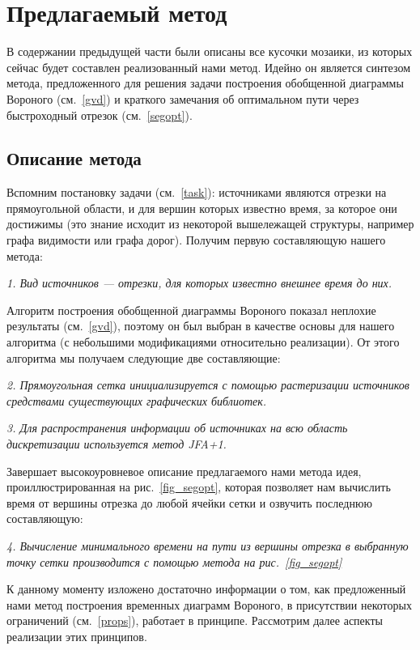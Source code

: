 \documentclass[12pt]{article}
\begin{document}
\section{Предлагаемый метод}
В содержании предыдущей части были описаны все кусочки мозаики, из которых 
сейчас будет составлен реализованный нами метод. Идейно он является синтезом
метода, предложенного для решения задачи построения обобщенной диаграммы Вороного 
(см.~\ref{gvd}) и краткого замечания об оптимальном пути через быстроходный 
отрезок (см.~\ref{segopt}).

\subsection{Описание метода}
Вспомним постановку задачи (см.~\ref{task}): источниками являются отрезки на прямоугольной
области, и для вершин которых известно время, за которое они достижимы (это знание исходит из
некоторой вышележащей структуры, например графа видимости или графа дорог). Получим 
первую  составляющую нашего метода:

\emph{1. Вид источников --- отрезки, для которых известно внешнее время до них.}

Алгоритм построения обобщенной диаграммы Вороного показал неплохие
результаты (см.~\ref{gvd}), поэтому он был выбран в качестве основы 
для нашего алгоритма (с небольшими модификациями относительно реализации).
От этого алгоритма мы получаем следующие две составляющие:

\emph{2. Прямоугольная сетка инициализируется с помощью растеризации
источников средствами существующих графических библиотек.}

\emph{3. Для распространения информации об источниках на всю
область дискретизации используется метод JFA+1.}

Завершает высокоуровневое описание предлагаемого нами метода
идея, проиллюстрированная на рис.~\ref{fig_segopt}, которая позволяет нам
вычислить время от вершины отрезка до любой ячейки сетки и озвучить
последнюю составляющую:

\emph{4. Вычисление минимального времени на пути из вершины отрезка
в выбранную точку сетки производится с помощью метода на рис.~\ref{fig_segopt}}

К данному моменту изложено достаточно информации о том, как предложенный 
нами метод построения временных диаграмм Вороного, в присутствии некоторых 
ограничений (см.~\ref{props}), работает в принципе. Рассмотрим далее 
аспекты реализации этих принципов.
\end{document}
